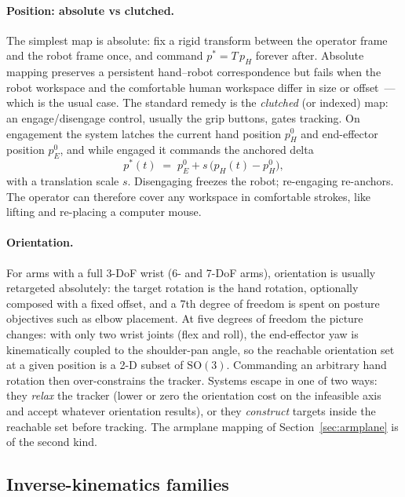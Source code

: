 \paragraph{Position: absolute vs clutched.}
The simplest map is absolute: fix a rigid transform between the operator
frame and the robot frame once, and command
\(p^\ast = T\,p_H\) forever after. Absolute mapping preserves a
persistent hand--robot correspondence but fails when the robot workspace
and the comfortable human workspace differ in size or offset~--- which
is the usual case. The standard remedy is the \emph{clutched} (or
indexed) map: an engage/disengage control, usually the grip buttons,
gates tracking. On engagement the system latches the current hand
position \(p_H^0\) and end-effector position \(p_E^0\), and while
engaged it commands the anchored delta
\begin{equation}
  p^\ast(t) \;=\; p_E^0 + s\,\bigl(p_H(t) - p_H^0\bigr),
  \label{eq:prelim-clutch}
\end{equation}
with a translation scale \(s\). Disengaging freezes the robot;
re-engaging re-anchors. The operator can therefore cover any workspace
in comfortable strokes, like lifting and re-placing a computer mouse.

\paragraph{Orientation.}
For arms with a full 3-DoF wrist (6- and 7-DoF arms), orientation is
usually retargeted absolutely: the target rotation is the hand rotation,
optionally composed with a fixed offset, and a 7th degree of freedom is
spent on posture objectives such as elbow placement. At five degrees of
freedom the picture changes: with only two wrist joints (flex and roll),
the end-effector yaw is kinematically coupled to the shoulder-pan angle,
so the reachable orientation set at a given position is a 2-D subset of
\(\mathrm{SO}(3)\). Commanding an arbitrary hand rotation then
over-constrains the tracker. Systems escape in one of two ways: they
\emph{relax} the tracker (lower or zero the orientation cost on the
infeasible axis and accept whatever orientation results), or they
\emph{construct} targets inside the reachable set before tracking. The
armplane mapping of Section~\ref{sec:armplane} is of the second kind.

\subsection{Inverse-kinematics families}
\label{sec:prelim-ik}

